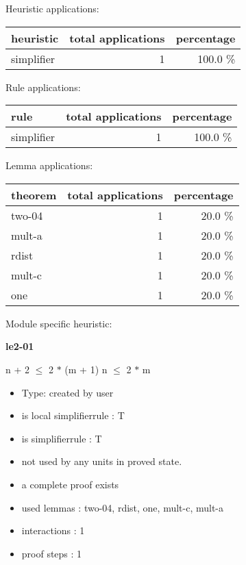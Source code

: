 \documentclass[a4paper]{article}
\begin{document}
Heuristic applications:

\begin{supertabular}{l|r|r}
heuristic	& total applications & percentage \\ \hline
simplifier & 1 & 100.0 \% \\

\end{supertabular}

Rule applications:

\begin{supertabular}{l|r|r}
rule	        & total applications & percentage \\ \hline
simplifier & 1 & 100.0 \% \\

\end{supertabular}

Lemma applications:

\begin{supertabular}{l|r|r}
theorem	        & total applications & percentage \\ \hline
two-04 & 1 & 20.0 \% \\
mult-a & 1 & 20.0 \% \\
rdist & 1 & 20.0 \% \\
mult-c & 1 & 20.0 \% \\
one & 1 & 20.0 \% \\

\end{supertabular}

Module specific heuristic:

\pagebreak

{\LARGE\bf le2-01}\label{lemma-le2-01}

\medskip

 \Fol n + 2 $\le$ 2 $*$ (m + 1) \Equiv n $\le$ 2 $*$ m

\begin{itemize}

\item Type: created by user

\item is local simplifierrule : T
\item is simplifierrule : T
\item not used by any units in proved state.
\item       a complete proof exists
\item       used lemmas  : two-04, rdist, one, mult-c, mult-a
\item       interactions : 1
\item       proof steps  : 1
\end{itemize}
\end{document}
